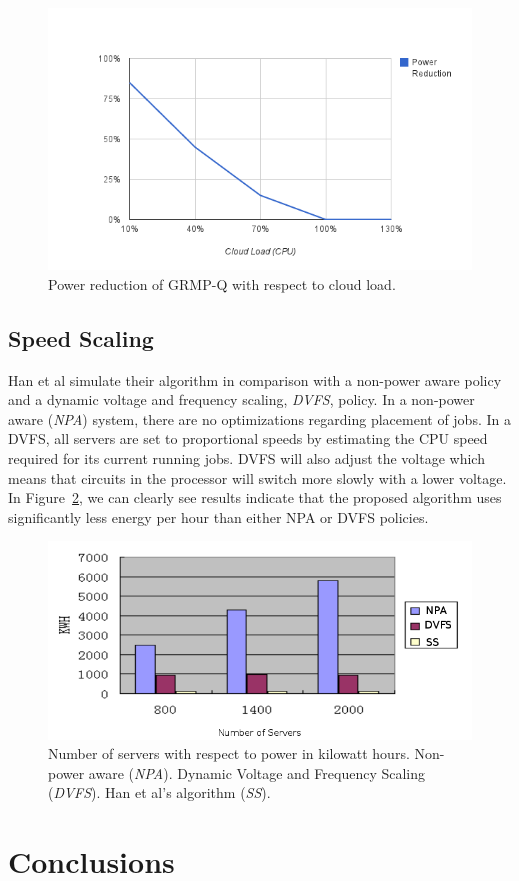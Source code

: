 \documentclass{sig-alternate}
\begin{document}
\begin{figure}[tb]
 \includegraphics[height=0.35 \textwidth]{image}
 \caption{Power reduction of GRMP-Q with respect to cloud load. }
 \label{fig:Results_PR}
\end{figure}

\subsection{Speed Scaling}
\label{sec:SS}

Han et al simulate their algorithm in comparison with a non-power aware policy and a dynamic voltage and frequency scaling, \emph{DVFS}, policy. In a non-power aware (\emph{NPA}) system, there are no optimizations regarding placement of jobs. In a DVFS, all servers are set to proportional speeds by estimating the CPU speed required for its current running jobs. DVFS will also adjust the voltage which means that circuits in the processor will switch more slowly with a lower voltage. In Figure~\ref{fig:Results_SS},  we can clearly see results indicate that the proposed algorithm uses significantly less energy per hour than either NPA or DVFS policies.


\begin{figure}[tb]
 \centering
 \includegraphics[height=0.2 \textwidth]{s4}
 \caption{Number of servers with respect to power in kilowatt hours. Non-power aware (\emph{NPA}). Dynamic Voltage and Frequency Scaling (\emph{DVFS}). Han et al's algorithm (\emph{SS}).}
 \label{fig:Results_SS}
\end{figure}

\section{Conclusions} 
\label{sec:conclusion}
\end{document}
